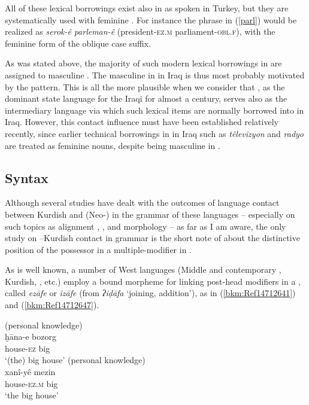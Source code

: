 \documentclass[output=paper]{langsci/langscibook}
\begin{document}
All of these lexical borrowings exist also in  as spoken in Turkey, but they are systematically used with feminine . For instance the phrase in (\ref{parl}) would be realized as \textit{serok-ê} \textit{parleman-ê} (president-\textsc{ez.m} parliament-\textsc{obl.f}), with the feminine form of the oblique case suffix. 

As was stated above, the majority of such modern lexical borrowings in  are assigned to masculine . The masculine  in  in Iraq is thus most probably motivated by the   pattern. This is all the more plausible when we consider that , as the dominant state language for the Iraqi  for almost a century, serves also as the intermediary language via which such lexical items are normally borrowed into  in Iraq. However, this contact influence must have been established relatively recently, since earlier technical borrowings in  in Iraq such as \textit{têlevizyon} and \textit{radyo} are treated as feminine nouns, despite being masculine in .  

\subsection{\label{bkm:Ref520275931} Syntax}

Although several studies have dealt with the outcomes of language contact between Kurdish and (Neo-) in the grammar of these languages – especially on such topics as alignment \citep{Coghill2016},  \citep{Haig2014}, and  morphology \citep{Noorlander2014} – as far as I am aware, the only study on –Kurdish contact in grammar is the short note of \citet{Tsabolov1994} about the distinctive position of the possessor in a multiple-modifier  in . 

As is well known, a number of West  languages (Middle and contemporary , Kurdish, , etc.) employ a bound morpheme for linking post-head modifiers in a , called \textit{ezāfe} or \textit{izāfe} (from  \textit{ʔiḍāfa} ‘joining, addition’), as in (\ref{bkm:Ref14712641}) and (\ref{bkm:Ref14712647}). 

\ea\label{bkm:Ref14712641} (personal knowledge)\\
\gll ḫāna-e bozorg\\
     house-\textsc{ez} big\\
\glt ‘(the) big house’
\ex \label{bkm:Ref14712647} (personal knowledge)\\
\gll xanî-yê mezin\\
     house-\textsc{ez.m} big\\
\glt ‘the big house’
\z
\end{document}

